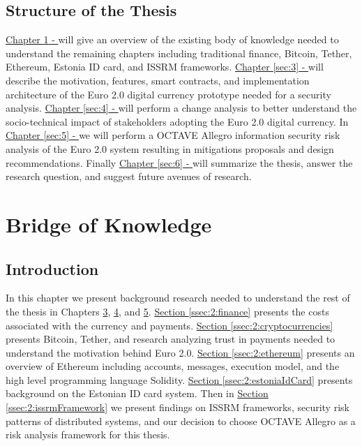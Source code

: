 \documentclass[a4paper,12pt]{article} %
\newcommand{\hypersectionref}[1]{\hyperref[#1]{Section \ref{#1}}}
\newcommand{\hyperchapterref}[1]{\hyperref[#1]{Chapter \ref{#1} - \nameref{#1}}}
\begin{document}
\subsection{Structure of the Thesis} \label{ssec:1.4}

\hyperchapterref{sec:2} will give an overview of the existing body of knowledge needed to understand the remaining chapters including traditional finance, Bitcoin, Tether, Ethereum, Estonia ID card, and ISSRM frameworks. \hyperchapterref{sec:3} will describe the motivation, features, smart contracts, and implementation architecture of the Euro 2.0 digital currency prototype needed for a security analysis. \hyperchapterref{sec:4} will perform a change analysis to better understand the socio-technical impact of stakeholders adopting the Euro 2.0 digital currency. In \hyperchapterref{sec:5} we will perform a OCTAVE Allegro information security risk analysis of the Euro 2.0 system resulting in mitigations proposals and design recommendations. Finally \hyperchapterref{sec:6} will summarize the thesis, answer the research question, and suggest future avenues of research.

\pagebreak

\section{Bridge of Knowledge} \label{sec:2}

\subsection{Introduction} \label{ssec:2:introduction}

In this chapter we present background research needed to understand the rest of the thesis in Chapters \hyperref[sec:3]{3}, \hyperref[sec:4]{4}, and \hyperref[sec:5]{5}. \hypersectionref{ssec:2:finance} presents the costs associated with the currency and payments. \hypersectionref{ssec:2:cryptocurrencies} presents Bitcoin, Tether, and research analyzing trust in payments needed to understand the motivation behind Euro 2.0. \hypersectionref{ssec:2:ethereum} presents an overview of Ethereum including accounts, messages, execution model, and the high level programming language Solidity. \hypersectionref{ssec:2:estoniaIdCard} presents background on the Estonian ID card system. Then in \hypersectionref{ssec:2:issrmFramework} we present findings on ISSRM frameworks, security risk patterns of distributed systems, and our decision to choose OCTAVE Allegro as a risk analysis framework for this thesis.
\end{document}

